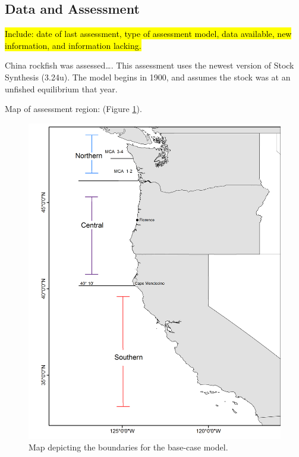\documentclass[12pt,]{article}
\begin{document}
\FloatBarrier

\newpage

\subsection*{Data and Assessment}\label{data-and-assessment}

\hl{Include: date of last assessment, type of assessment model, data available, new 
information, and information lacking.}

China rockfish was assessed\ldots{}. This assessment uses the newest
version of Stock Synthesis (3.24u). The model begins in 1900, and
assumes the stock was at an unfished equilibrium that year.

Map of assessment region: (Figure \ref{fig:assess_region_map}).

\begin{figure}[htbp]
\centering
\includegraphics{Figures/assess_region_map.png}
\caption{Map depicting the boundaries for the base-case model.
\label{fig:assess_region_map}}
\end{figure}
\end{document}
